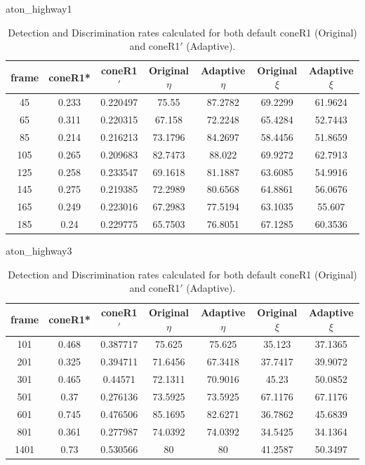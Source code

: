 \begin{appendices}
\begin{table}
\centering
\caption{aton\_highway1}
\caption*{Detection and Discrimination rates calculated for both default coneR1 (Original) and coneR1$'$ (Adaptive).}
\begin{tabular}{ |c|c|c|c|c|c|c| }
\hline
\textbf{frame} &  \textbf{coneR1*} &  \textbf{coneR1$'$} &  \textbf{Original $\eta$} &  \textbf{Adaptive $\eta$} &  \textbf{Original $\xi$} &  \textbf{Adaptive $\xi$} \\
\hline
\hline
45 &  0.233 &  0.220497 &  75.55 &  87.2782 &  69.2299 &  61.9624 \\
\hline
65 &  0.311 &  0.220315 &  67.158 &  72.2248 &  65.4284 &  52.7443 \\
\hline
85 &  0.214 &  0.216213 &  73.1796 &  84.2697 &  58.4456 &  51.8659 \\
\hline
105 &  0.265 &  0.209683 &  82.7473 &  88.022 &  69.9272 &  62.7913 \\
\hline
125 &  0.258 &  0.233547 &  69.1618 &  81.1887 &  63.6085 &  54.9916 \\
\hline
145 &  0.275 &  0.219385 &  72.2989 &  80.6568 &  64.8861 &  56.0676 \\
\hline
165 &  0.249 &  0.223016 &  67.2983 &  77.5194 &  63.1035 &  55.607 \\
\hline
185 &  0.24 &  0.229775 &  65.7503 &  76.8051 &  67.1285 &  60.3536 \\
\hline
\end{tabular}

\end{table}

\begin{table}
\centering
\caption{aton\_highway3}
\caption*{Detection and Discrimination rates calculated for both default coneR1 (Original) and coneR1$'$ (Adaptive).}
\begin{tabular}{ |c|c|c|c|c|c|c| }
\hline
\textbf{frame} &  \textbf{coneR1*} &  \textbf{coneR1$'$} &  \textbf{Original $\eta$} &  \textbf{Adaptive $\eta$} &  \textbf{Original $\xi$} &  \textbf{Adaptive $\xi$} \\
\hline
101 &  0.468 &  0.387717 &  75.625 &  75.625 &  35.123 &  37.1365 \\
\hline
201 &  0.325 &  0.394711 &  71.6456 &  67.3418 &  37.7417 &  39.9072 \\
\hline
301 &  0.465 &  0.44571 &  72.1311 &  70.9016 &  45.23 &  50.0852 \\
\hline
501 &  0.37 &  0.276136 &  73.5925 &  73.5925 &  67.1176 &  67.1176 \\
\hline
601 &  0.745 &  0.476506 &  85.1695 &  82.6271 &  36.7862 &  45.6839 \\
\hline
801 &  0.361 &  0.277987 &  74.0392 &  74.0392 &  34.5425 &  34.1364 \\
\hline
1401 &  0.73 &  0.530566 &  80 &  80 &  41.2587 &  50.3497 \\
\hline


\end{tabular}
\end{table}
\end{appendices}
